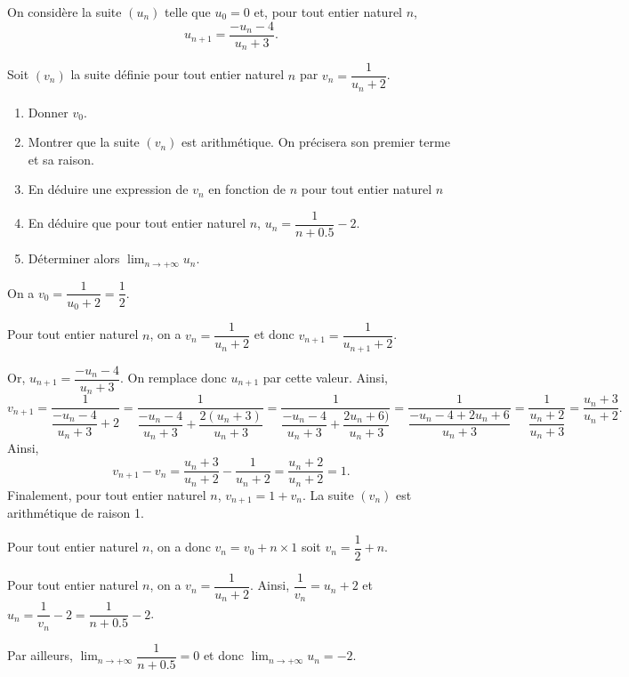 \documentclass[11pt,fleqn]{book} %
\begin{document}
\begin{exercise}[subtitle={(Nouvelle-Calédonie 2023)}]
On considère la suite $(u_n)$ telle que $u_0=0$ et, pour tout entier naturel $n$,
\[u_{n+1}=\dfrac{-u_n-4}{u_n+3}.\]

Soit $(v_n)$ la suite définie pour tout entier naturel $n$ par $v_n=\dfrac{1}{u_n+2}$.
\begin{enumerate}
\item Donner $v_0$.
\item Montrer que la suite $(v_n)$ est arithmétique. On précisera son premier terme et sa raison.
\item En déduire une expression de $v_n$ en fonction de $n$ pour tout entier naturel $n$
\item En déduire que pour tout entier naturel $n$, $u_n=\dfrac{1}{n+0.5}-2$.
\item Déterminer alors $\displaystyle\lim_{n \to +\infty}u_n$.
\end{enumerate}
\end{exercise}
\begin{solution}

On a $v_0=\dfrac{1}{u_0+2}=\dfrac{1}{2}$.

Pour tout entier naturel $n$, on a $v_n = \dfrac{1}{u_n+2}$ et donc $v_{n+1}=\dfrac{1}{u_{n+1}+2}$.

Or, $u_{n+1}=\dfrac{-u_n-4}{u_n+3}$. On remplace donc $u_{n+1}$ par cette valeur. Ainsi,
\[v_{n+1}=\dfrac{1}{\dfrac{-u_n-4}{u_n+3}+2}=\dfrac{1}{\dfrac{-u_n-4}{u_n+3}+\dfrac{2(u_n+3)}{u_n+3}}=\dfrac{1}{\dfrac{-u_n-4}{u_n+3}+\dfrac{2u_n+6)}{u_n+3}}=\dfrac{1}{\dfrac{-u_n-4+2u_n+6}{u_n+3}}=\dfrac{1}{\dfrac{u_n+2}{u_n+3}}=\dfrac{u_n+3}{u_n+2}.\]
Ainsi,
\[v_{n+1}-v_n = \dfrac{u_n+3}{u_n+2} - \dfrac{1}{u_n+2}=\dfrac{u_n+2}{u_n+2}=1.\]
Finalement, pour tout entier naturel $n$, $v_{n+1}=1+v_n$. La suite $(v_n)$ est arithmétique de raison 1.


Pour tout entier naturel $n$, on a donc $v_n=v_0 +n \times 1$ soit $v_n=\dfrac{1}{2}+n$.

Pour tout entier naturel $n$, on a $v_n=\dfrac{1}{u_n+2}$. Ainsi, $\dfrac{1}{v_n}=u_n+2$ et $u_n=\dfrac{1}{v_n}-2=\dfrac{1}{n+0.5}-2$.

Par ailleurs, $\displaystyle\lim_{n \to +\infty}\dfrac{1}{n+0.5}=0$ et donc $\displaystyle\lim_{n \to +\infty}u_n=-2$.
\end{solution}
\end{document}

